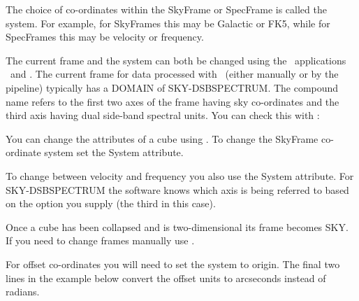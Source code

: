 \documentclass[11pt,oneside,chapters]{starlink}
\providecommand{\att}[1]{\textsf{#1}}
\begin{document}
The choice of co-ordinates within the SkyFrame or SpecFrame is called
the system. For example, for SkyFrames this may be Galactic or FK5,
while for SpecFrames this may be velocity or frequency.

The current frame and the system can both be changed using the \Kappa\
applications \wcsframe\ and \wcsattrib. The current frame for data
processed with \makecube\ (either manually or by the pipeline)
typically has a DOMAIN of SKY-DSBSPECTRUM. The compound name refers to
the first two axes of the frame having sky co-ordinates and the third
axis having dual side-band spectral units. You can check this with
\ndftrace:

\begin{terminalv}
\end{terminalv}
You can change the attributes of a cube using \wcsattrib. To change
the SkyFrame co-ordinate system set the \att{System} attribute.
\begin{terminalv}
\end{terminalv}
To change between velocity and frequency you also use the
\att{System} attribute. For SKY-DSBSPECTRUM the software knows which
axis is being referred to based on the option you supply (the third in
this case).
\begin{terminalv}
\end{terminalv}
Once a cube has been collapsed and is two-dimensional its frame
becomes SKY. If you need to change frames manually use \wcsframe.
\begin{terminalv}
\end{terminalv}

For offset co-ordinates you will need to set the system
 to origin. The final two lines in the example below
convert the offset units to arcseconds instead of radians.
\begin{terminalv}
\end{terminalv}

%

%
\end{document}
